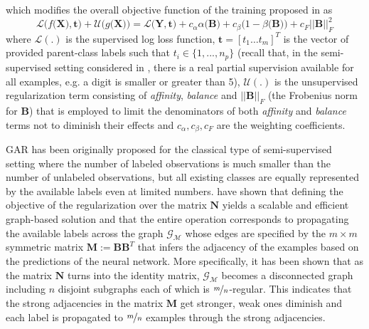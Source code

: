 \documentclass{article} \usepackage{iclr2018_conference,times}
\begin{document}
which modifies the overall objective function of the training proposed in \citet{KilincU17ACOL} as
\begin{equation}
\label{eq:pseudo_overallobj}
\mathcal{L}\big(f\big(\boldsymbol{X}\big), \boldsymbol{t}\big) + 
\mathcal{U}\big(g\big(\boldsymbol{X}\big)\big) = 
\mathcal{L}\big(\boldsymbol{Y}, \boldsymbol{t}\big) + c_{\alpha}\alpha\big(\boldsymbol{B}\big) + c_{\beta}\big(1-\beta\big(\boldsymbol{B}\big)\big) + c_F||\boldsymbol{B}||^2_F
\end{equation}
where $\mathcal{L}(.)$ is the supervised log loss function, $\boldsymbol{t}=[t_1\dots t_{m}]^T$ is the vector of provided parent-class labels such that $t_i \in \{1,...,n_p\}$ (recall that, in the semi-supervised setting considered in \citet{KilincU17ACOL}, there is a real partial supervision available for all examples, e.g. a digit is smaller or greater than 5), $\mathcal{U}(.)$ is the unsupervised regularization term consisting of \textit{affinity}, \textit{balance} and $||\boldsymbol{B}||_F$ (the Frobenius norm for $\boldsymbol{B}$) that is employed to limit the denominators of both \textit{affinity} and \textit{balance} terms not to diminish their effects and $c_{\alpha}, c_{\beta}, c_F$ are the weighting coefficients. 

GAR has been originally proposed for the classical type of semi-supervised setting where the number of labeled observations is much smaller than the number of unlabeled observations, but all existing classes are equally represented by the available labels even at limited numbers. \citet{KilincU17GAR} have shown that defining the objective of the regularization over the matrix $\boldsymbol{N}$ yields a scalable and efficient graph-based solution and that the entire operation corresponds to propagating the available labels across the graph $\mathcal{G}_\mathcal{M}$ whose edges are specified by the $m \times m$ symmetric matrix $\boldsymbol{M}:=\boldsymbol{B}\boldsymbol{B}^T$ that infers the adjacency of the examples based on the predictions of the neural network. More specifically, it has been shown that as the matrix $\boldsymbol{N}$ turns into the identity matrix, $\mathcal{G}_\mathcal{M}$ becomes a disconnected graph including $n$ disjoint subgraphs each of which is $\nicefrac{m}{n}$-regular. This indicates that the strong adjacencies in the matrix $\boldsymbol{M}$ get stronger, weak ones diminish and each label is propagated to $\nicefrac{m}{n}$ examples through the strong adjacencies. 
\end{document}
